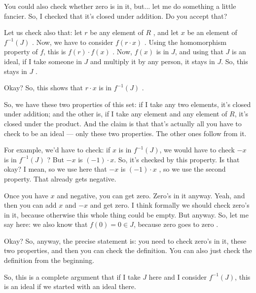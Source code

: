 \begin{speech}[00:12:45 - 00:14:42]
You could also check whether zero is in it, but... let me do something a little fancier. So, I checked that it's closed under addition. Do you accept that?

Let us check also that: let $r$ be any element of $R$ , and let $x$ be an element of $f^{-1}(J)$ . Now, we have to consider $f(r \cdot x)$ . Using the homomorphism property of $f$, this is $f(r) \cdot f(x)$ . Now, $f(x)$ is in $J$, and using that $J$ is an ideal, if I take someone in $J$ and multiply it by any person, it stays in $J$. So, this stays in $J$ .

Okay? So, this shows that $r \cdot x$ is in $f^{-1}(J)$ .

So, we have these two properties of this set: if I take any two elements, it's closed under addition; and the other is, if I take any element and any element of $R$, it's closed under the product. And the claim is that that's actually all you have to check to be an ideal --- only these two properties. The other ones follow from it.

For example, we'd have to check: if $x$ is in $f^{-1}(J)$, we would have to check $-x$ is in $f^{-1}(J)$ ? But $-x$ is $(-1) \cdot x$. So, it's checked by this property. Is that okay? I mean, so we use here that $-x$ is $(-1) \cdot x$ , so we use the second property. That already gets negative.

Once you have $x$ and negative, you can get zero. Zero's in it anyway. Yeah, and then you can add $x$ and $-x$ and get zero. I think formally we should check zero's in it, because otherwise this whole thing could be empty. But anyway. So, let me say here: we also know that $f(0) = 0 \in J$, because zero goes to zero .

Okay? So, anyway, the precise statement is: you need to check zero's in it, these two properties, and then you can check the definition. You can also just check the definition from the beginning.

So, this is a complete argument that if I take $J$ here and I consider $f^{-1}(J)$, this is an ideal if we started with an ideal there.
\end{speech}

